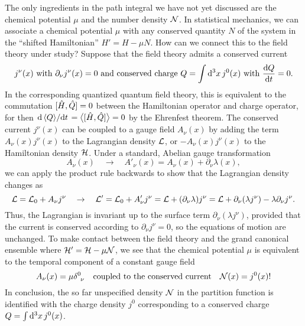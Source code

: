 The only ingredients in the path integral we have not yet discussed are the chemical potential $\mu$ and the number density $\mathcal{N}$.
In statistical mechanics, we can associate a chemical potential $\mu$ with any conserved quantity $N$ of the system in the ``shifted Hamiltonian'' $H' = H - \mu N$.
How can we connect this to the field theory under study?
Suppose that the field theory admits a conserved current
\begin{equation}
	j^\nu(x)
	\text{ with }
	\partial_\nu j^\nu(x) = 0
	\text{ and conserved charge }
	Q = \int \dif^3 x \, j^0(x)
	\text{ with }
	\odv{Q}{t} = 0.
\label{eq:tft:conserved_current}
\end{equation}
In the corresponding quantized quantum field theory, this is equivalent to the commutation $[ \hat{H} , \hat{Q} ] = 0$ between the Hamiltonian operator and charge operator,
for then $\odv{\Avg{Q}}/{t} = \big< \comm{\hat{H}}{\hat{Q}} \big> = 0$ by the Ehrenfest theorem.
The conserved current $j^\nu(x)$ can be coupled to a gauge field $A_\nu(x)$ by adding the term $A_\nu(x) j^\nu(x)$ to the Lagrangian density $\mathcal{L}$, or $-A_\nu(x) j^\nu(x)$ to the Hamiltonian density $\mathcal{H}$.
Under a standard, Abelian gauge transformation
\begin{equation}
	A_\nu(x) \quad \rightarrow \quad A'_\nu(x) = A_\nu(x) + \partial_\nu \lambda(x) ,
\label{eq:tft:gauge_transformation}
\end{equation}
we can apply the product rule backwards to show that the Lagrangian density changes as
\begin{equation}
	\mathcal{L} = \mathcal{L}_0 + A_\nu j^\nu \quad \rightarrow \quad \mathcal{L}' = \mathcal{L}_0 + A'_\nu j^\nu
	      = \mathcal{L}   + (\partial_\nu \lambda) j^\nu
	      = \mathcal{L}   + \partial_\nu (\lambda j^\nu) - \lambda \partial_\nu j^\nu .
\end{equation}
Thus, the Lagrangian is invariant up to the surface term $\partial_\nu (\lambda j^\nu)$, provided that the current is conserved according to $\partial_\nu j^\nu = 0$, so the equations of motion are unchanged.
To make contact between the field theory and the grand canonical ensemble where $\mathcal{H}' = \mathcal{H} - \mu \mathcal{N}$, we see that the chemical potential $\mu$ is equivalent to the temporal component of a constant gauge field
\begin{equation}
	A_\nu(x) = \mu \delta\indices{^0_\nu} 
	\quad \text{coupled to the conserved current} \quad
	\numdensity(x) = j^0(x)!
\label{eq:tft:chemical_potential}
\end{equation}
In conclusion, the so far unspecified density $\mathcal{N}$ in the partition function is identified with the charge density $j^0$ corresponding to a conserved charge $Q = \int \mathop{}\!\mathrm{d}^3 x \, j^0(x)$.

